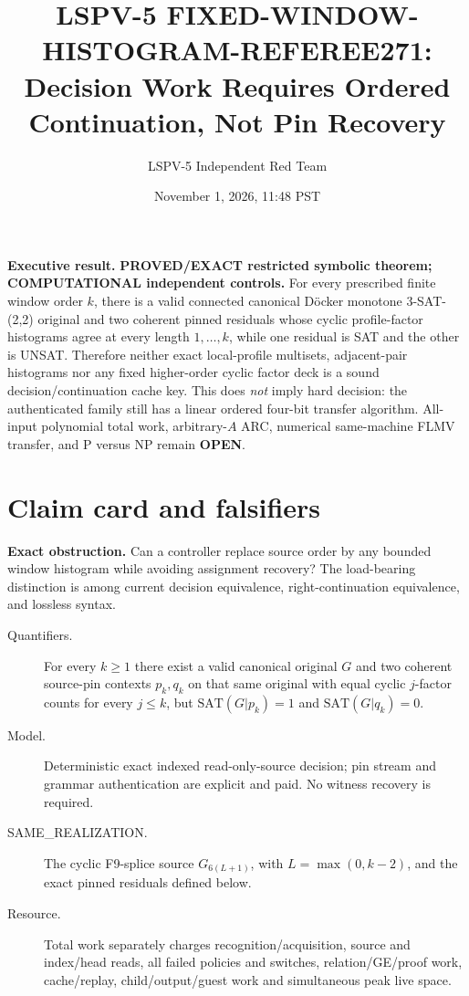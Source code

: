 \documentclass[11pt]{article}
\title{LSPV-5 FIXED-WINDOW-HISTOGRAM-REFEREE271:\\Decision Work Requires Ordered Continuation, Not Pin Recovery}
\author{LSPV-5 Independent Red Team}
\date{November 1, 2026, 11:48 PST}
\begin{document}
\maketitle

\noindent\textbf{Executive result.}
\textbf{PROVED/EXACT restricted symbolic theorem; COMPUTATIONAL independent controls.}
For every prescribed finite window order $k$, there is a valid connected canonical
D\"ocker monotone 3-SAT-(2,2) original and two coherent pinned residuals whose
cyclic profile-factor histograms agree at every length $1,\ldots,k$, while one
residual is SAT and the other is UNSAT.  Therefore neither exact local-profile
multisets, adjacent-pair histograms nor any fixed higher-order cyclic factor deck
is a sound decision/continuation cache key.  This does \emph{not} imply hard
decision: the authenticated family still has a linear ordered four-bit transfer
algorithm.  All-input polynomial total work, arbitrary-$A$ ARC, numerical
same-machine FLMV transfer, and P versus NP remain \textbf{OPEN}.

\section{Claim card and falsifiers}
\textbf{Exact obstruction.} Can a controller replace source order by any bounded
window histogram while avoiding assignment recovery?  The load-bearing distinction
is among current decision equivalence, right-continuation equivalence, and lossless
syntax.

\begin{description}
\item[Quantifiers.] For every $k\ge1$ there exist a valid canonical original $G$ and
two coherent source-pin contexts $p_k,q_k$ on that same original with equal cyclic
$j$-factor counts for every $j\le k$, but
$\mathrm{SAT}(G|p_k)=1$ and $\mathrm{SAT}(G|q_k)=0$.
\item[Model.] Deterministic exact indexed read-only-source decision; pin stream and
grammar authentication are explicit and paid.  No witness recovery is required.
\item[SAME\_REALIZATION.] The cyclic F9-splice source $G_{6(L+1)}$, with
$L=\max(0,k-2)$, and the exact pinned residuals defined below.
\item[Resource.] Total work separately charges recognition/acquisition, source and
index/head reads, all failed policies and switches, relation/GE/proof work,
cache/replay, child/output/guest work and simultaneous peak live space.
\end{description}
\end{document}

